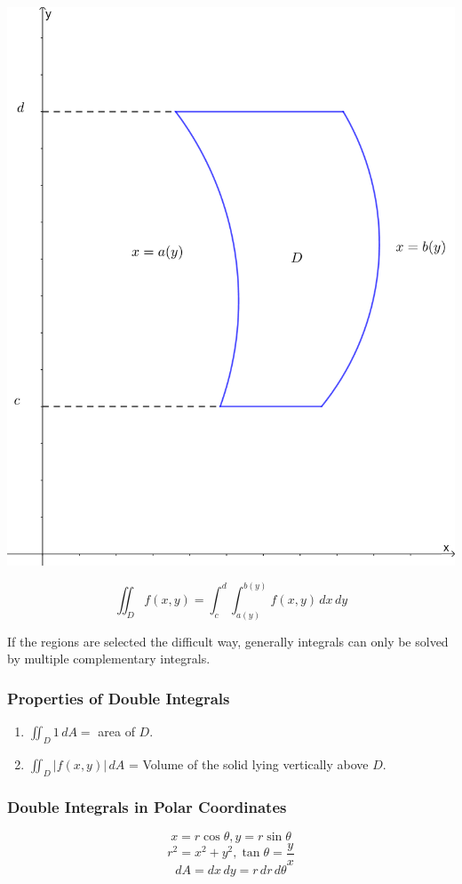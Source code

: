 \documentclass[12pt]{article}
\begin{document}
\begin{enumerate}
\includegraphics[scale=0.35]{xsimple.png}

$$\iint_D f(x,y) = \int_c^d \int_{a(y)}^{b(y)} f(x,y)\,dx\,dy$$

\end{enumerate}
If the regions are selected the difficult way, generally integrals can only be solved by multiple complementary integrals.

\subsubsection{Properties of Double Integrals}
\begin{enumerate}
\item $\displaystyle{\iint_D 1\, dA = }$ area of $D$.
\item $\displaystyle{\iint_D |f(x,y)|\,dA}$ = Volume of the solid lying vertically above $D$.

\end{enumerate}
\subsubsection{Double Integrals in Polar Coordinates}
$$x=r \cos \theta, y=r \sin \theta$$
$$r^2=x^2+y^2, \tan \theta = \frac{y}{x}$$
$$dA = dx\,dy = r\,dr\,d\theta$$
\end{document}
